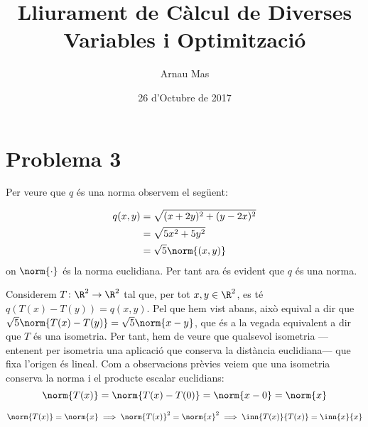 \documentclass[12pt]{article}
\title{Lliurament de Càlcul de Diverses Variables i Optimització}
\author{Arnau Mas}
\date{26 d'Octubre de 2017}
\begin{document}
\maketitle

\section*{Problema 3}
Per veure que \( q \) és una norma observem el següent:

\begin{align*}
  q(x,y) &= \sqrt{(x+2y)^{2} + (y-2x)^{2}} \\
  			 &= \sqrt{5x^{2} + 5y^{2}} \\
				 &= \sqrt{5}\norm{(x,y)}
\end{align*}
on \( \norm{\cdot}\) és la norma euclidiana. Per tant ara és evident que \( q \) és una norma.

Considerem \( T \colon \R^{2} \to \R^{2} \) tal que, per tot \( x, y \in \R^{2} \), es té \( q(T(x) - T(y)) = q(x,y) \). Pel que hem vist abans, això equival a dir que \( \sqrt{5}\norm{T(x) - T(y)} = \sqrt{5}\norm{x-y} \), que és a la vegada equivalent a dir que \( T \) és una isometria. Per tant, hem de veure que qualsevol isometria ---entenent per isometria una aplicació que conserva la distància euclidiana--- que fixa l'origen és lineal. Com a observacions prèvies veiem que una isometria conserva la norma i el producte escalar euclidians: 
\begin{equation*}
	\norm{T(x)} = \norm{T(x) - T(0)}  = \norm{x-0} = \norm{x}
\end{equation*}

\begin{equation*}
	\norm{T(x)} = \norm{x} \implies \norm{T(x)}^{2} = \norm{x}^{2} \implies \inn{T(x)}{T(x)} = \inn{x}{x}
\end{equation*}
\end{document}
